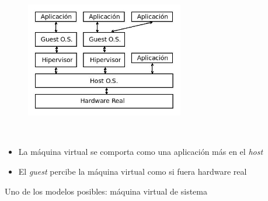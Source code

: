 \documentclass[ucs]{beamer}
\begin{document}
\begin{frame}[fragile]

\begin{minipage}{5cm}
\begin{figure}
\centerline{\includegraphics[width=6.9cm]{figs/cajas_hiperv}}
\end{figure}
\end{minipage} \hfill
\
\begin{minipage}{4cm}
\begin{itemize} 
\item
La máquina virtual se comporta como una aplicación más en el \emph{host} 
\item
El \emph{guest} percibe la máquina virtual como si fuera hardware real
\end{itemize}
\end{minipage}\hfill

\begin{footnotesize}
Uno de los modelos posibles: máquina virtual de sistema
\end{footnotesize}
\end{frame}



\end{document}
